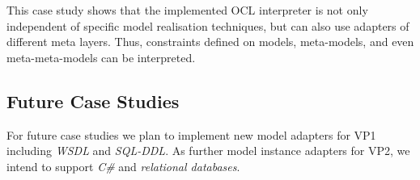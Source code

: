 This case study shows that the implemented OCL interpreter is not only independent
of specific model realisation techniques, but can also use adapters of different meta layers.
Thus, constraints defined on models, meta-models, and even meta-meta-models can be interpreted.



\subsection{Future Case Studies}

For future case studies we plan to implement new model adapters for VP1
including \emph{WSDL} and \emph{SQL-DDL}. As further model instance adapters for 
VP2, we intend to support \emph{C\#} and \emph{relational databases}.

